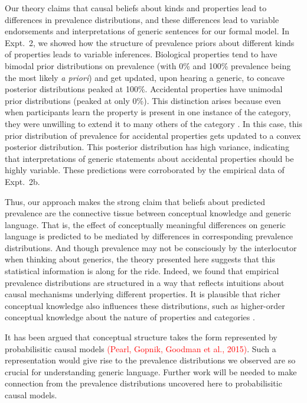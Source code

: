 \documentclass[12pt,letterpaper]{article}
\newcommand{\red}[1]{\textcolor{Red}{#1}}
\begin{document}
Our theory claims that causal beliefs about kinds and properties lead to differences in prevalence distributions, and these differences lead to variable endorsements and interpretations of generic sentences for our formal model. 
In Expt.~2, we showed how the structure of prevalence priors about different kinds of properties leads to variable inferences. 
Biological properties tend to have bimodal prior distributions on prevalence (with 0\% and 100\% prevalence being the most likely \emph{a priori}) and get updated, upon hearing a generic, to concave posterior distributions peaked at 100\%.
Accidental properties have unimodal prior distributions (peaked at only 0\%). 
This distinction arises because even when participants learn the property is present in one instance of the category, they were unwilling to extend it to many others of the category \cite{Goodman1955}. 
In this case, this prior distribution of prevalence for accidental properties gets updated to a convex posterior distribution.
This posterior distribution has high variance, indicating that interpretations of generic statements about accidental properties should be highly variable.
These predictions were corroborated by the empirical data of Expt.~2b. 

Thus, our approach makes the strong claim that beliefs about predicted prevalence are the connective tissue between conceptual knowledge and generic language.
That is, the effect of conceptually meaningful differences on generic language is predicted to be mediated by differences in corresponding prevalence distributions.
And though prevalence may not be consciously by the interlocutor when thinking about generics, the theory presented here suggests that this statistical information is along for the ride. 
Indeed, we found that empirical prevalence distributions are structured in a way that reflects intuitions about causal mechanisms underlying different properties.
It is plausible that richer conceptual knowledge also influences these distributions, such as higher-order conceptual knowledge about the nature of properties and categories \cite{Gelman2003,Keil1992}. 

It has been argued that conceptual structure takes the form represented by probabilisitic causal models \red{(Pearl, Gopnik, Goodman et al., 2015)}. 
Such a representation would give rise to the prevalence distributions we observed are so crucial for understanding generic language. 
Further work will be needed to make connection from the prevalence distributions uncovered here to probabilisitic causal models.
\end{document}
